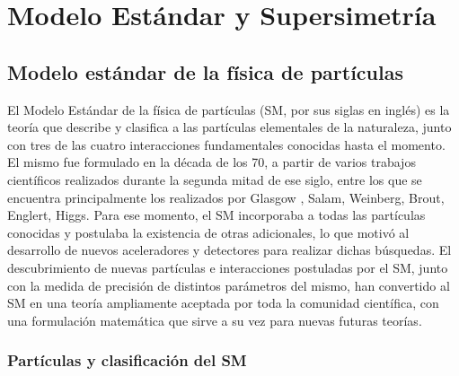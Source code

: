 \chapter{Modelo Estándar y Supersimetría}

\section{Modelo estándar de la física de partículas}

El Modelo Estándar de la física de partículas (SM, por sus siglas en inglés) es la teoría que describe y clasifica a las partículas elementales de la naturaleza, junto con tres de las cuatro interacciones fundamentales conocidas hasta el momento. El mismo fue formulado en la década de los 70, a partir de varios trabajos científicos realizados durante la segunda mitad de ese siglo, entre los que se encuentra principalmente los realizados por Glasgow \cite{GLASHOW1961579}, Salam\cite{salam}, Weinberg\cite{PhysRevLett.19.1264}, Brout, Englert, Higgs\cite{PhysRevLett.13.321, PhysRevLett.13.508,PhysRevLett.13.585}. Para ese momento, el SM incorporaba a todas las partículas conocidas y postulaba la existencia de otras adicionales, lo que motivó al desarrollo de nuevos aceleradores y detectores para realizar dichas búsquedas. El descubrimiento de nuevas partículas e interacciones postuladas por el SM, junto con la medida de precisión de distintos parámetros del mismo, han convertido al SM en una teoría ampliamente aceptada por toda la comunidad científica, con una formulación matemática que sirve a su vez para nuevas futuras teorías.

\subsection{Partículas y clasificación del SM}

